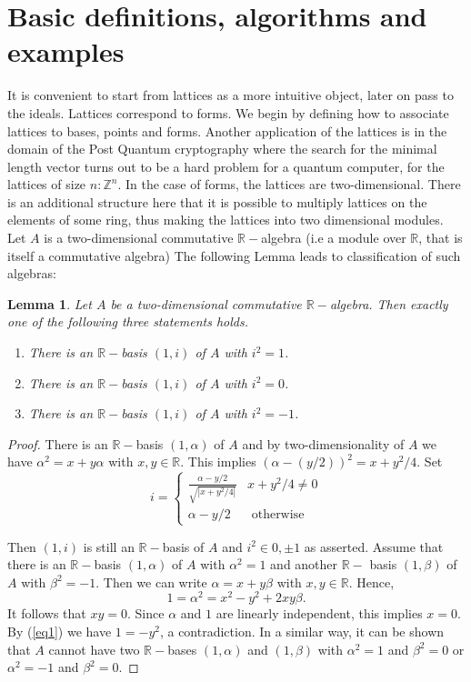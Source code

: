 \documentclass[12pt, letterpaper]{report}
\newtheorem{lemma}{Lemma}
\begin{document}
\section{Basic definitions, algorithms and examples}
It is convenient to start from lattices as a more intuitive object, later on pass to the ideals.
Lattices correspond to forms. We begin by defining how to associate lattices to bases, points and forms. Another application of the lattices is in the domain 
of the Post Quantum cryptography where the search for the minimal length vector turns out to be a hard problem for a quantum computer, for the lattices of 
size $n: \mathbb{Z}^{n}$. In the case of forms, the lattices are two-dimensional. There is an additional structure here that it is possible to multiply lattices
on the elements of some ring, thus making the lattices into two dimensional modules. Let $A$ is a two-dimensional commutative $\mathbb{R}-$algebra 
(i.e a module over $\mathbb{R}$, that is itself a commutative algebra) The following Lemma leads to classification of such algebras:
\begin{lemma}
\label{lemma1}
Let $A$ be a two-dimensional commutative $\mathbb{R}-$algebra. Then exactly one of the following three statements holds.
\begin{enumerate}
\item There is an $\mathbb{R}-$basis $(1, i)$ of $A$ with $i^2 = 1$.
\item There is an $\mathbb{R}-$basis $(1, i)$ of $A$ with $i^2 = 0$.
\item There is an $\mathbb{R}-$basis $(1, i)$ of $A$ with $i^2 = -1$.
\end{enumerate}
\end{lemma}
\begin{proof}
There is an $\mathbb{R}-$basis $(1, \alpha)$ of $A$ and by two-dimensionality of $A$ we have $\alpha^2 = x + y\alpha$ with $x, y \in \mathbb{R}$.
This implies $(\alpha - (y/2))^2 = x + y^2/4$.
Set
$$
i =\left\{
\begin{array}{ll}
\frac{\alpha - y/2}{\sqrt{|x + y^2/4|}} & x + y^2/4 \not = 0 \\
\alpha - y/2 & \mbox{ otherwise }
\end{array}
\right.
$$

Then $(1, i)$ is still an $\mathbb{R}-$basis of $A$ and $i^2 \in {0, \pm 1}$ as asserted.
Assume that there is an $\mathbb{R}-$basis $(1, \alpha)$ of $A$ with $\alpha^2 = 1$ and another 
$\mathbb{R}-$ basis $(1, \beta)$ of $A$ with $\beta^2 = -1$. Then we can write $\alpha = x + y\beta$ with $x, y \in \mathbb{R}$.
Hence,
\begin{equation}
1 = \alpha^2 = x^2 - y^2 + 2xy\beta.
\label{eq1}
\end{equation}
It follows that $xy = 0$. Since $\alpha$ and $1$ are linearly independent, this implies
$x = 0$. By (\ref{eq1}) we have $1 = -y^2$, a contradiction. In a similar way, it can
be shown that $A$ cannot have two $\mathbb{R}-$bases $(1, \alpha)$ and $(1, \beta)$ with $\alpha^2 = 1$ and
$\beta^2 = 0$ or $\alpha^2 = -1$ and $\beta^2 = 0$.
\end{proof}
\end{document}
